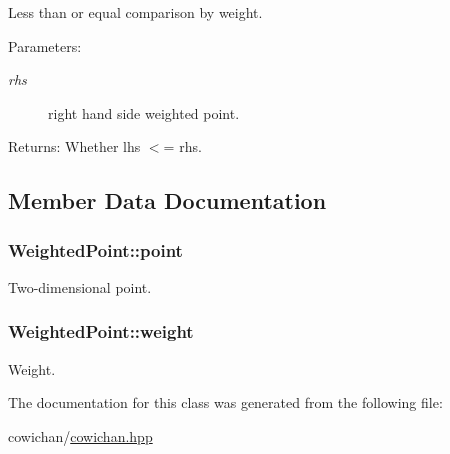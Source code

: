 Less than or equal comparison by weight. \begin{Desc}
\item[Parameters:]
\begin{description}
\item[{\em rhs}]right hand side weighted point. \end{description}
\end{Desc}
\begin{Desc}
\item[Returns:]Whether lhs $<$= rhs. \end{Desc}


\subsection{Member Data Documentation}
\hypertarget{class_weighted_point_ab8d1b3ff0e79d5b479e5f61eee1be23}{
\subsubsection[{point}]{ {\bf WeightedPoint::point}}}
\label{class_weighted_point_ab8d1b3ff0e79d5b479e5f61eee1be23}


Two-dimensional point. \hypertarget{class_weighted_point_e41e421882ec4d21e70379120c2eab61}{
\subsubsection[{weight}]{ {\bf WeightedPoint::weight}}}
\label{class_weighted_point_e41e421882ec4d21e70379120c2eab61}


Weight. 

The documentation for this class was generated from the following file:\begin{CompactItemize}
\item 
cowichan/\hyperlink{cowichan_8hpp}{cowichan.hpp}\end{CompactItemize}
